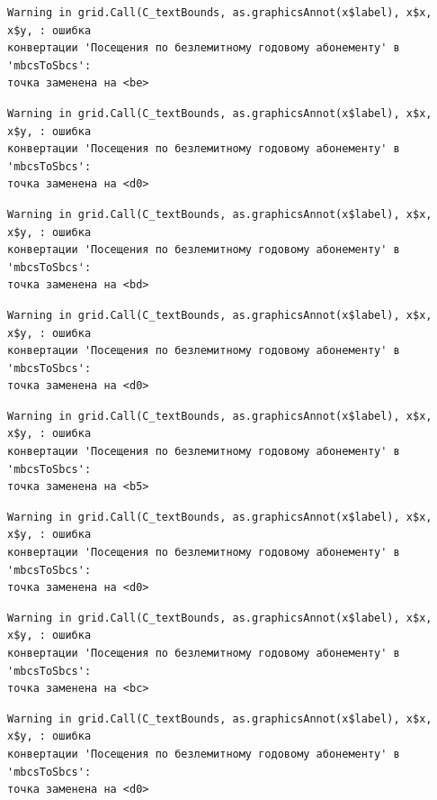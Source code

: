 \documentclass[
  letterpaper,
  DIV=11,
  numbers=noendperiod]{scrreprt}
\begin{document}
\begin{verbatim}
Warning in grid.Call(C_textBounds, as.graphicsAnnot(x$label), x$x, x$y, : ошибка
конвертации 'Посещения по безлемитному годовому абонементу' в 'mbcsToSbcs':
точка заменена на <be>
\end{verbatim}

\begin{verbatim}
Warning in grid.Call(C_textBounds, as.graphicsAnnot(x$label), x$x, x$y, : ошибка
конвертации 'Посещения по безлемитному годовому абонементу' в 'mbcsToSbcs':
точка заменена на <d0>
\end{verbatim}

\begin{verbatim}
Warning in grid.Call(C_textBounds, as.graphicsAnnot(x$label), x$x, x$y, : ошибка
конвертации 'Посещения по безлемитному годовому абонементу' в 'mbcsToSbcs':
точка заменена на <bd>
\end{verbatim}

\begin{verbatim}
Warning in grid.Call(C_textBounds, as.graphicsAnnot(x$label), x$x, x$y, : ошибка
конвертации 'Посещения по безлемитному годовому абонементу' в 'mbcsToSbcs':
точка заменена на <d0>
\end{verbatim}

\begin{verbatim}
Warning in grid.Call(C_textBounds, as.graphicsAnnot(x$label), x$x, x$y, : ошибка
конвертации 'Посещения по безлемитному годовому абонементу' в 'mbcsToSbcs':
точка заменена на <b5>
\end{verbatim}

\begin{verbatim}
Warning in grid.Call(C_textBounds, as.graphicsAnnot(x$label), x$x, x$y, : ошибка
конвертации 'Посещения по безлемитному годовому абонементу' в 'mbcsToSbcs':
точка заменена на <d0>
\end{verbatim}

\begin{verbatim}
Warning in grid.Call(C_textBounds, as.graphicsAnnot(x$label), x$x, x$y, : ошибка
конвертации 'Посещения по безлемитному годовому абонементу' в 'mbcsToSbcs':
точка заменена на <bc>
\end{verbatim}

\begin{verbatim}
Warning in grid.Call(C_textBounds, as.graphicsAnnot(x$label), x$x, x$y, : ошибка
конвертации 'Посещения по безлемитному годовому абонементу' в 'mbcsToSbcs':
точка заменена на <d0>
\end{verbatim}
\end{document}
